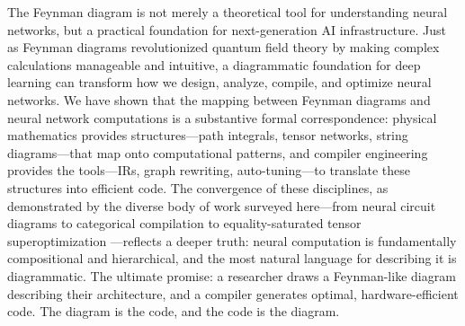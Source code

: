 \documentclass[12pt,a4paper]{article}
\begin{document}
The Feynman diagram is not merely a theoretical tool for understanding neural networks, but a practical foundation for next-generation AI infrastructure. Just as Feynman diagrams revolutionized quantum field theory by making complex calculations manageable and intuitive, a diagrammatic foundation for deep learning can transform how we design, analyze, compile, and optimize neural networks. We have shown that the mapping between Feynman diagrams and neural network computations is a substantive formal correspondence: physical mathematics provides structures---path integrals, tensor networks, string diagrams---that map onto computational patterns, and compiler engineering provides the tools---IRs, graph rewriting, auto-tuning---to translate these structures into efficient code. The convergence of these disciplines, as demonstrated by the diverse body of work surveyed here---from neural circuit diagrams \cite{abbott2024neural} to categorical compilation \cite{abbott2025accelerating} to equality-saturated tensor superoptimization \cite{wu2024mirage, wu2026prism}---reflects a deeper truth: neural computation is fundamentally compositional and hierarchical, and the most natural language for describing it is diagrammatic. The ultimate promise: a researcher draws a Feynman-like diagram describing their architecture, and a compiler generates optimal, hardware-efficient code. The diagram is the code, and the code is the diagram.

\printbibliography
\end{document}
